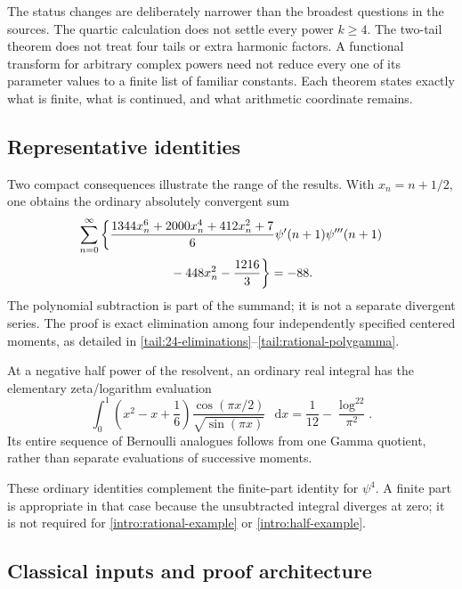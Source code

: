 \documentclass[11pt,a4paper]{article}
\numberwithin{equation}{section}
\theoremstyle{definition}
\theoremstyle{remark}
\newcommand{\dd}{\mathop{}\!\mathrm{d}}
\begin{document}
The status changes are deliberately narrower than the broadest
questions in the sources. The quartic calculation does not settle
every power $k\ge4$. The two-tail theorem does not treat four tails
or extra harmonic factors. A functional transform for arbitrary
complex powers need not reduce every one of its parameter values to
a finite list of familiar constants. Each theorem states exactly
what is finite, what is continued, and what arithmetic coordinate
remains.

\subsection{Representative identities}

Two compact consequences illustrate the range of the results.
With $x_n=n+1/2$, one obtains the ordinary absolutely convergent sum
\begin{equation}\label{intro:rational-example}
\begin{aligned}
\sum_{n=0}^{\infty}\bigg\{&
\frac{1344x_n^6+2000x_n^4+412x_n^2+7}{6}
                  \psi'(n+1)\psi'''(n+1)\\
&\hspace{17mm}-448x_n^2-\frac{1216}{3}\bigg\}=-88.
\end{aligned}
\end{equation}
The polynomial subtraction is part of the summand; it is not a
separate divergent series. The proof is exact elimination among
four independently specified centered moments, as detailed in
\eqref{tail:24-eliminations}--\eqref{tail:rational-polygamma}.

At a negative half power of the resolvent, an ordinary real integral
has the elementary zeta/logarithm evaluation
\begin{equation}\label{intro:half-example}
\int_0^1\left(x^2-x+\frac16\right)
       \frac{\cos(\pi x/2)}{\sqrt{\sin(\pi x)}}\,\dd x
       =\frac1{12}-\frac{\log^22}{\pi^2}.
\end{equation}
Its entire sequence of Bernoulli analogues follows from one Gamma
quotient, rather than separate evaluations of successive moments.

These ordinary identities complement the finite-part identity for
$\psi^4$. A finite part is appropriate in that case because the
unsubtracted integral diverges at zero; it is not required for
\eqref{intro:rational-example} or \eqref{intro:half-example}.

\subsection{Classical inputs and proof architecture}
\end{document}
